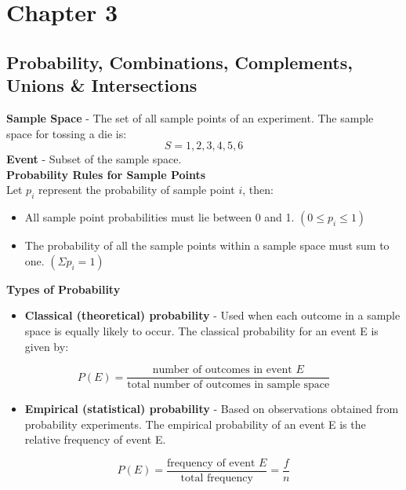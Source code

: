 \documentclass[a4paper]{article}
\let\bf\textbf
\begin{document}
\section{Chapter 3}
\subsection{Probability, Combinations, Complements, Unions \& Intersections}
\bf{Sample Space} - The set of all sample points of an experiment. The sample space for tossing a die is:
\begin{equation}
    S = {1, 2, 3, 4, 5, 6}
\end{equation}
\bf{Event} - Subset of the sample space.
\vspace{5mm}\\
\bf{Probability Rules for Sample Points}\\
Let $p_i$ represent the probability of sample point $i$, then:
\begin{itemize}
    \item All sample point probabilities must lie between 0 and 1. $(0 \leq p_i \leq 1)$
    \item The probability of all the sample points within a sample space must sum to one. $(\Sigma p_i = 1)$
\end{itemize}
\vspace{5mm}
\bf{Types of Probability}
\begin{itemize}
    \item \bf{Classical (theoretical) probability} - Used when each outcome in a sample space is equally likely to occur. The classical probability for an event E is given by:
\end{itemize}
\begin{equation}
    P(E) = \frac{\text{number of outcomes in event $E$}}{\text{total number of outcomes in sample space}}
\end{equation}
\begin{itemize}
    \item \bf{Empirical (statistical) probability} - Based on observations obtained from probability experiments. The empirical probability of an event E is the relative frequency of event E.
\end{itemize}
\begin{equation}
    P(E) = \frac{\text{frequency of event $E$}}{\text{total frequency}} = \frac{f}{n}
\end{equation}
\end{document}
